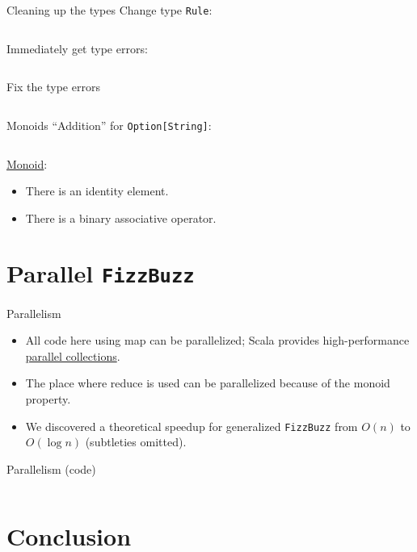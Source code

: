 \begin{frame}[fragile]{Cleaning up the types}
  Change type \texttt{Rule}:
  \inputminted[gobble=2]{scala}{FizzBuzz6.scala}

  Immediately get type errors:

  \inputminted[gobble=2]{console}{testQuick10.console}
\end{frame}

\begin{frame}[fragile]{Fix the type errors}

  \inputminted[gobble=2]{scala}{FizzBuzz7.scala}
\end{frame}

\begin{frame}[fragile]{Monoids}
  ``Addition'' for \texttt{Option[String]}:
  \inputminted[gobble=2]{scala}{FizzBuzz8.scala}
  
  \href{http://en.wikipedia.org/wiki/Monoid}{Monoid}:
  \begin{itemize}
  \item There is an identity element.
  \item There is a binary associative operator.
  \end{itemize}
\end{frame}

\section{Parallel \texttt{FizzBuzz}}

\begin{frame}[fragile]{Parallelism}
  \begin{itemize}
  \item All code here using \alert{map} can be parallelized; Scala provides high-performance \href{http://scala-blitz.github.io/}{parallel collections}.
  \item The place where \alert{reduce} is used can be parallelized because of the monoid property.
  \item We discovered a theoretical speedup for generalized \texttt{FizzBuzz} from $O(n)$ to $O(\log n)$ (subtleties omitted).
  \end{itemize}
\end{frame}

\begin{frame}[fragile]{Parallelism (code)}
  \inputminted[gobble=2]{scala}{FizzBuzz9.scala}
\end{frame}

\section*{Conclusion}

